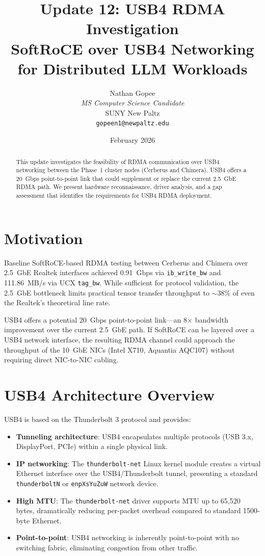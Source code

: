 \documentclass[11pt,letterpaper]{article}
\title{
    \vspace{-1cm}
    \textbf{Update 12: USB4 RDMA Investigation} \\[0.5em]
    \large SoftRoCE over USB4 Networking for Distributed LLM Workloads
}
\author{
    Nathan Gopee \\
    \textit{MS Computer Science Candidate} \\
    SUNY New Paltz \\
    \texttt{gopeen1@newpaltz.edu}
}
\date{February 2026}
\begin{document}
\maketitle

\begin{abstract}
\noindent
This update investigates the feasibility of RDMA communication over USB4 networking between the Phase~1 cluster nodes (Cerberus and Chimera). USB4 offers a 20~Gbps point-to-point link that could supplement or replace the current 2.5~GbE RDMA path. We present hardware reconnaissance, driver analysis, and a gap assessment that identifies the requirements for USB4 RDMA deployment.
\end{abstract}

\section{Motivation}

Baseline SoftRoCE-based RDMA testing between Cerberus and Chimera over 2.5~GbE Realtek interfaces achieved 0.91~Gbps via \texttt{ib\_write\_bw} and 111.86~MB/s via UCX \texttt{tag\_bw}. While sufficient for protocol validation, the 2.5~GbE bottleneck limits practical tensor transfer throughput to $\sim$38\% of even the Realtek's theoretical line rate.

USB4 offers a potential 20~Gbps point-to-point link---an 8$\times$ bandwidth improvement over the current 2.5~GbE path. If SoftRoCE can be layered over a USB4 network interface, the resulting RDMA channel could approach the throughput of the 10~GbE NICs (Intel X710, Aquantia AQC107) without requiring direct NIC-to-NIC cabling.

\section{USB4 Architecture Overview}

USB4 is based on the Thunderbolt 3 protocol and provides:

\begin{itemize}
    \item \textbf{Tunneling architecture}: USB4 encapsulates multiple protocols (USB 3.x, DisplayPort, PCIe) within a single physical link.
    \item \textbf{IP networking}: The \texttt{thunderbolt-net} Linux kernel module creates a virtual Ethernet interface over the USB4/Thunderbolt tunnel, presenting a standard \texttt{thunderboltN} or \texttt{enpXsYuZuW} network device.
    \item \textbf{High MTU}: The \texttt{thunderbolt-net} driver supports MTU up to 65,520 bytes, dramatically reducing per-packet overhead compared to standard 1500-byte Ethernet.
    \item \textbf{Point-to-point}: USB4 networking is inherently point-to-point with no switching fabric, eliminating congestion from other traffic.
\end{itemize}
\end{document}
